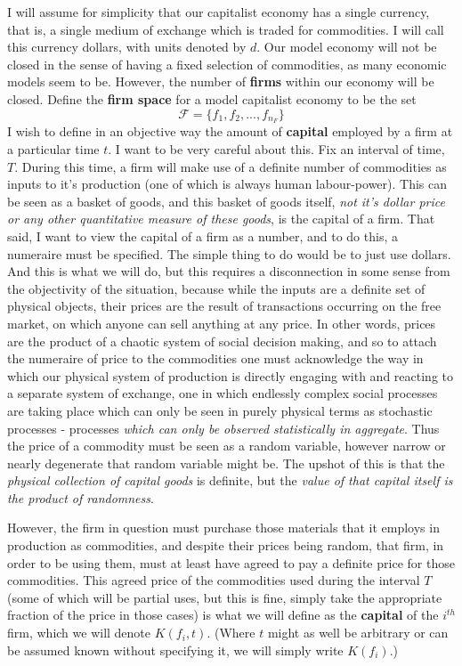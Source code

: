 \documentclass{article}
\theoremstyle{definition}
\theoremstyle{plain}
\theoremstyle{theorem}
\begin{document}
I will assume for simplicity that our capitalist economy has a single currency, that is, a single medium of exchange which is traded for commodities. I will call this currency dollars, with units denoted by $d$. Our model economy will not be closed in the sense of having a fixed selection of commodities, as many economic models seem to be. However, the number of \textbf{firms} within our economy will be closed. Define the \textbf{firm space} for a model capitalist economy to be the set
	 \[ \mathcal{F} = \{ f_1,f_2,...,f_{n_F} \} \]
I wish to define in an objective way the amount of \textbf{capital} employed by a firm at a particular time $t$. I want to be very careful about this. Fix an interval of time, $T$. During this time, a firm will make use of a definite number of commodities as inputs to it's production (one of which is always human labour-power). This can be seen as a basket of goods, and this basket of goods itself, \textit{not it's dollar price or any other quantitative measure of these goods}, is the capital of a firm. That said, I want to view the capital of a firm as a number, and to do this, a numeraire must be specified. The simple thing to do would be to just use dollars. And this is what we will do, but this requires a disconnection in some sense from the objectivity of the situation, because while the inputs are a definite set of physical objects, their prices are the result of transactions occurring on the free market, on which anyone can sell anything at any price. In other words, prices are the product of a chaotic system of social decision making, and so to attach the numeraire of price to the commodities one must acknowledge the way in which our physical system of production is directly engaging with and reacting to a separate system of exchange, one in which endlessly complex social processes are taking place which can only be seen in purely physical terms as stochastic processes - processes \textit{which can only be observed statistically in aggregate}. Thus the price of a commodity must be seen as a random variable, however narrow or nearly degenerate that random variable might be. The upshot of this is that the \textit{physical collection of capital goods} is definite, but the \textit{value of that capital itself is the product of randomness}. 
\par 
However, the firm in question must purchase those materials that it employs in production as commodities, and despite their prices being random, that firm, in order to be using them, must at least have agreed to pay a definite price for those commodities. This agreed price of the commodities used during the interval $T$ (some of which will be partial uses, but this is fine, simply take the appropriate fraction of the price in those cases) is what we will define as the \textbf{capital} of the $i^{th}$ firm, which we will denote $K(f_i,t)$. (Where $t$ might as well be arbitrary or can be assumed known without specifying it, we will simply write  $K(f_i)$.) \par 
\end{document}

